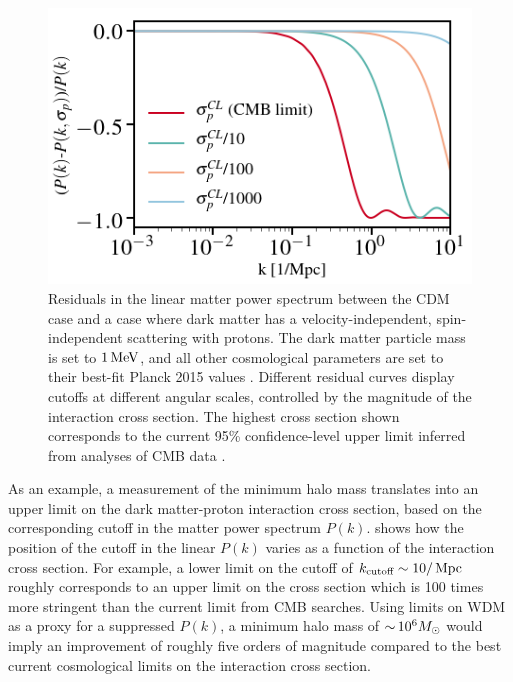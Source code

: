 \begin{figure}
\centering
\includegraphics[width=0.6\columnwidth]{figures/dmbaryon_pk2.png}
\caption{Residuals in the linear matter power spectrum between the CDM case and a case where dark matter has a velocity-independent, spin-independent scattering with protons. The dark matter particle mass is set to $1\mathrm{\,MeV}$, and all other cosmological parameters are set to their best-fit Planck 2015 values \citep{Ade:2015xua}. Different residual curves display cutoffs at different angular scales, controlled by the magnitude of the interaction cross section. The highest cross section shown corresponds to the current 95\% confidence-level upper limit inferred from analyses of CMB data \citep{Gluscevic:2017ywp,Boddy:2018kfv}.
}
\label{fig:dmbaryon_pk}
\end{figure}

As an example, a measurement of the minimum halo mass translates into an upper limit on the dark matter-proton interaction cross section, based on the corresponding cutoff in the matter power spectrum $P(k)$.  shows how the position of the cutoff in the linear $P(k)$ varies as a function of the interaction cross section. For example, a lower limit on the cutoff of $k_\text{cutoff} \sim 10/\mathrm{\,Mpc}$ roughly corresponds to an upper limit on the cross section which is 100 times more stringent than the current limit from CMB searches. Using limits on WDM as a proxy for a suppressed $P(k)$, a minimum halo mass of $ {\sim}\, 10^6 M_\odot$ would imply an improvement of roughly five orders of magnitude compared to the best current cosmological limits on the interaction cross section.
